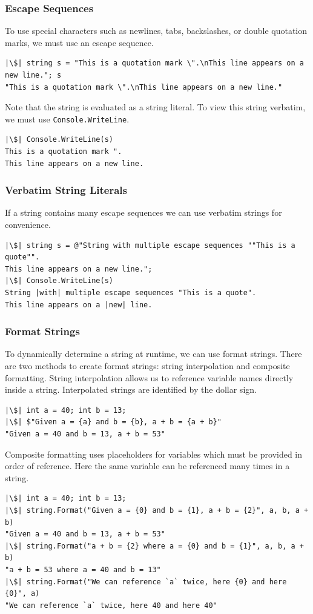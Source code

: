 \documentclass{article}
\begin{document}
\subsubsection{Escape Sequences}
To use special characters such as newlines, tabs, backslashes, or
double quotation marks, we must use an escape sequence.
\begin{verbatim}
|\$| string s = "This is a quotation mark \".\nThis line appears on a new line."; s
"This is a quotation mark \".\nThis line appears on a new line."
\end{verbatim}
Note that the string is evaluated as a string literal. To view this
string verbatim, we must use \texttt{Console.WriteLine}.
\begin{verbatim}
|\$| Console.WriteLine(s)
This is a quotation mark ".
This line appears on a new line.
\end{verbatim}
\subsubsection{Verbatim String Literals}
If a string contains many escape sequences we can use verbatim strings
for convenience.
\begin{verbatim}
|\$| string s = @"String with multiple escape sequences ""This is a quote"".
This line appears on a new line.";
|\$| Console.WriteLine(s)
String |with| multiple escape sequences "This is a quote".
This line appears on a |new| line.
\end{verbatim}
\subsubsection{Format Strings}
To dynamically determine a string at runtime, we can use format
strings. There are two methods to create format strings: string
interpolation and composite formatting. String interpolation allows us
to reference variable names directly inside a string. Interpolated
strings are identified by the dollar sign.
\begin{verbatim}
|\$| int a = 40; int b = 13;
|\$| $"Given a = {a} and b = {b}, a + b = {a + b}"
"Given a = 40 and b = 13, a + b = 53"
\end{verbatim}
Composite formatting uses placeholders for variables which must be
provided in order of reference. Here the same variable can be
referenced many times in a string.
\begin{verbatim}
|\$| int a = 40; int b = 13;
|\$| string.Format("Given a = {0} and b = {1}, a + b = {2}", a, b, a + b)
"Given a = 40 and b = 13, a + b = 53"
|\$| string.Format("a + b = {2} where a = {0} and b = {1}", a, b, a + b)
"a + b = 53 where a = 40 and b = 13"
|\$| string.Format("We can reference `a` twice, here {0} and here {0}", a)
"We can reference `a` twice, here 40 and here 40"
\end{verbatim}
\end{document}
